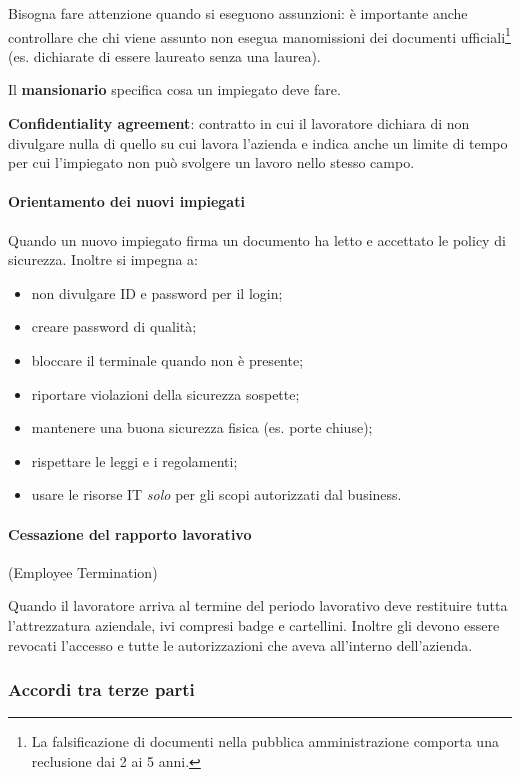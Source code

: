 Bisogna fare attenzione quando si eseguono assunzioni: è
importante anche controllare che chi viene assunto non esegua manomissioni dei
documenti ufficiali\footnote{La falsificazione di documenti nella pubblica
amministrazione comporta una reclusione dai 2 ai 5 anni.} (es. dichiarate di
essere laureato senza una laurea).

Il \textbf{mansionario} specifica cosa un impiegato deve fare.

\textbf{Confidentiality agreement}: contratto in cui il lavoratore dichiara di 
non divulgare nulla di quello su cui lavora l'azienda e indica anche un limite 
di tempo per cui l'impiegato non può svolgere un lavoro nello stesso campo.


\paragraph{Orientamento dei nuovi impiegati}

Quando un nuovo impiegato firma un documento ha letto e accettato le policy di
sicurezza. Inoltre si impegna a:
\begin{itemize}
\item non divulgare ID e password per il login;
\item creare password di qualità;
\item bloccare il terminale quando non è presente;
\item riportare violazioni della sicurezza sospette;
\item mantenere una buona sicurezza fisica (es. porte chiuse);
\item rispettare le leggi e i regolamenti;
\item usare le risorse IT \emph{solo} per gli scopi autorizzati dal
business.
\end{itemize}

\paragraph{Cessazione del rapporto lavorativo} (Employee Termination)

Quando il lavoratore arriva al termine del periodo lavorativo deve
restituire tutta l'attrezzatura aziendale, ivi compresi badge e cartellini.
Inoltre gli devono essere revocati l'accesso e tutte le autorizzazioni
che aveva all'interno dell'azienda.


\subsubsection{Accordi tra terze parti}

